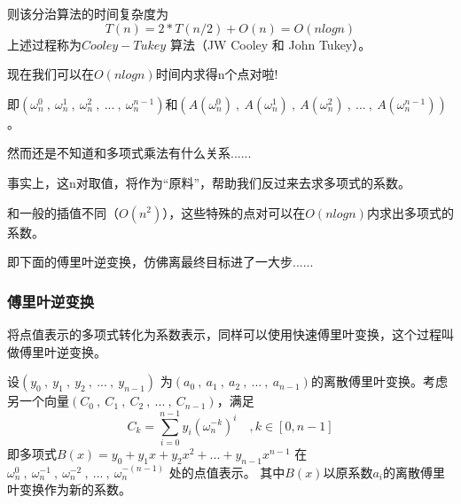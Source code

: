 则该分治算法的时间复杂度为
$$
T(n)=2*T(n/2)+O(n)=O(nlogn)
$$
上述过程称为{\heiti $Cooley-Tukey$ 算法（JW Cooley 和 John Tukey）}。

{\heiti 现在我们可以在$O(nlogn)$时间内求得n个点对啦!}

即$(\omega_n^0\ ,\ \omega_n^1\ ,\ \omega_n^2\ ,\ ...\ ,\ \omega_n^{n-1})$和$(A(\omega_n^0)\ ,\ A(\omega_n^1)\ ,\ A(\omega_n^2)\ ,\ ...\ ,\ A(\omega_n^{n-1}))$。

然而还是不知道和多项式乘法有什么关系......

事实上，这n对取值，将作为“原料”，帮助我们{\heiti 反过来去求多项式的系数}。

和一般的插值不同（$O(n^2)$），{\heiti 这些特殊的点对可以在$O(nlogn)$内求出多项式的系数}。

即下面的傅里叶逆变换，仿佛离最终目标进了一大步......

\subsubsection{傅里叶逆变换}
将点值表示的多项式转化为系数表示，同样可以使用快速傅里叶变换，这个过程叫做{\heiti 傅里叶逆变换}。

设$(y_0\ ,\ y_1\ ,\ y_2\ ,\ ...\ ,\ y_{n-1})$ 为$(a_0\ ,\ a_1\ ,\ a_2\ ,\ ...\ ,\ a_{n-1})$的离散傅里叶变换。考虑另一个向量$(C_0\ ,\ C_1\ ,\ C_2\ ,\ ...\ ,\ C_{n-1})$，满足
$$
C_k=\sum_{i=0}^{n-1}y_i(\omega_n^{-k})^i   \quad,k\in [0,n-1]
$$
即多项式$B(x)=y_0+y_1x+y_2x^2+...+y_{n-1}x^{n-1}$ 在$\omega_n^0\ ,\ \omega_n^{-1}\ ,\ \omega_n^{-2}\ ,\ ...\ ,\ \omega_n^{-(n-1)}$ 处的点值表示。
其中{\heiti $B(x)$以原系数$a_i$的离散傅里叶变换作为新的系数。}

